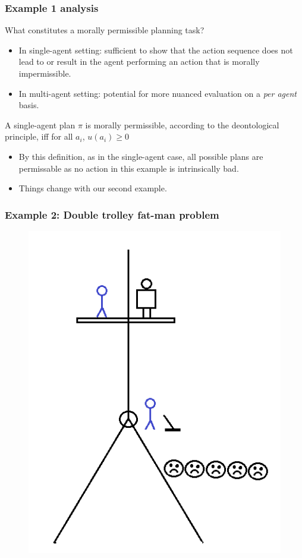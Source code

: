 \documentclass{beamer}
\begin{document}
\begin{frame}
\frametitle{Example 1 analysis}

What constitutes a morally permissible planning task?
\begin{itemize}
\item In single-agent setting: sufficient to show that the action sequence does not lead to or result in the agent performing an action that is morally impermissible.
\item In multi-agent setting: potential for more nuanced evaluation on a \textit{per agent} basis.
\end{itemize}
\begin{definition}
A single-agent plan $\pi$ is morally permissible, according to the deontological principle, iff for all $a_i$, $u(a_i) \geq 0$
\end{definition}
\begin{itemize}
\item By this definition, as in the single-agent case, all possible plans are permissable as no action in this example is intrinsically bad.
\item Things change with our second example.
\end{itemize}
\end{frame}




\begin{frame}
\frametitle{Example 2: Double trolley fat-man problem}


\begin{figure}
\includegraphics[scale=1]{extended2}
\end{figure}
\end{frame}
\end{document}

